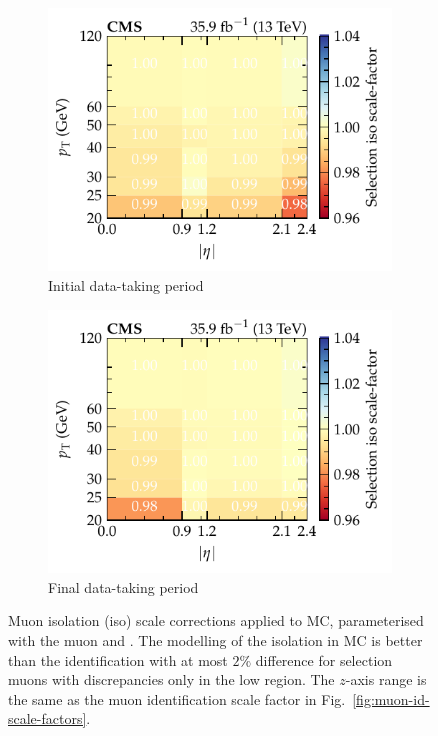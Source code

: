 \begin{figure}[htbp]
    \\
    \begin{subfigure}[b]{0.49\textwidth}
        \centering
        \includegraphics{chapters/041_corrections/images/efficiencies/objects/muons/muon_iso_tight_runbf.pdf}
        \caption{Initial data-taking period}
        \label{subfigc:muon-iso-scale-factors}
    \end{subfigure}
    \hfill
    \begin{subfigure}[b]{0.49\textwidth}
        \centering
        \includegraphics{chapters/041_corrections/images/efficiencies/objects/muons/muon_iso_tight_rungh.pdf}
        \caption{Final data-taking period}
        \label{subfigd:muon-iso-scale-factors}
    \end{subfigure}
    \caption{
        Muon isolation (iso) scale corrections applied to MC, parameterised
        with the muon \pt and \aeta. The modelling of the isolation in MC is
        better than the identification with at most $2\%$ difference for
        selection muons with discrepancies only in the low \pt region. The
        $z$-axis range is the same as the muon identification scale factor in
        Fig.~\ref{fig:muon-id-scale-factors}.
    }
    \label{fig:muon-iso-scale-factors}
\end{figure}


